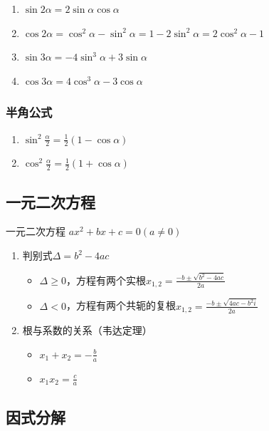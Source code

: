 \documentclass[../book.tex]{subfiles}
\begin{document}
\begin{enumerate}
    \item $\sin 2\alpha = 2\sin \alpha \cos \alpha$
    \item $\cos 2\alpha = \cos^2 \alpha - \sin^2 \alpha = 1 - 2\sin^2 \alpha = 2\cos^2 \alpha - 1$
    \item $\sin 3\alpha = -4\sin^3 \alpha + 3\sin \alpha$
    \item $\cos 3\alpha = 4\cos^3 \alpha - 3\cos \alpha$
\end{enumerate}

\subsubsection{半角公式}

\begin{enumerate}
    \item $\sin^2 \displaystyle\frac{\alpha}{2} = \displaystyle\frac{1}{2}(1 - \cos \alpha)$
    \item $\cos^2 \displaystyle\frac{\alpha}{2} = \displaystyle\frac{1}{2}(1 + \cos \alpha)$
\end{enumerate}

\subsection{一元二次方程}

一元二次方程 $ax^2 + bx + c = 0(a \neq 0)$

\begin{enumerate}
    \item 判别式$\Delta = b^2 - 4ac$
    \begin{itemize}
        \item $\Delta \geq 0$，方程有两个实根$x_{1, 2} = \displaystyle\frac{-b \pm \sqrt {b^2 - 4ac}}{2a}$
        \item $\Delta < 0$，方程有两个共轭的复根$x_{1, 2} = \displaystyle\frac{-b \pm \sqrt {4ac - b^2 i}}{2a}$
    \end{itemize}
    \item 根与系数的关系（韦达定理）
    \begin{itemize}
        \item $x_1 + x_2 = -\displaystyle\frac{b}{a}$
        \item $x_{1}x_2 = \displaystyle\frac{c}{a}$
    \end{itemize}
\end{enumerate}

\subsection{因式分解}
\end{document}
